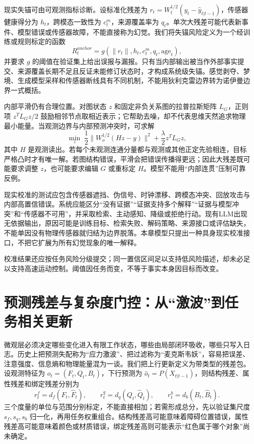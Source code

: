 现实失锚可由可观测指标诊断。设标准化残差为 $r_t=W_t^{1/2}(y_t-\hat y_{t|t-1})$，传感器健康得分为 $h_t$，跨模态一致性为 $c_t^{m}$，来源覆盖率为 $q_t$。单次大残差可能代表新事件、模型错误或传感器故障，不能直接称为幻觉。我们将失锚风险定义为一个经训练或规则标定的函数
\[
R_t^{anchor}=g(\|r_t\|,h_t,c_t^{m},q_t,\text{age}_t),
\]
并要求 $g$ 的阈值在验证集上给出误报与漏报。只有当内部输出被当作外部事实提交、来源覆盖长期不足且反证未能修订状态时，才构成系统级失锚。感觉剥夺、梦境、生成模型采样和传感器断线具有不同机制，不能用狄利克雷边界转为诺伊曼边界一式概括。

内部平滑仍有合理位置。对图状态 $z$ 和固定非负关系图的拉普拉斯矩阵 $L_G$，正则项 $z^TL_Gz/2$ 鼓励相邻节点取相近表示；它帮助去噪，却不代表思维天然追求物理最小能量。当观测边界与内部预测冲突时，可求解
\[
\min_z\;\frac12\|W_o^{1/2}(Hz-y)\|^2+\frac{\lambda}{2}z^TL_Gz,
\]
其中 $H$ 是观测读出。若每个未观测连通分量都与观测或其他正定先验相连，目标严格凸时才有唯一解。若图结构错误，平滑会把错误传播得更远；因此大残差既可能要求调整 $z$，也可能要求编辑 $G$ 或重标定 $H$。模型不能用“内部连贯”压制可靠反例。

现实校准的测试应包含传感器遮挡、伪信号、时钟漂移、跨模态冲突、回放攻击与内部高置信错误。系统应能区分“没有证据”“证据支持多个解释”“证据与模型冲突”和“传感器不可用”，并采取检索、主动感知、降级或拒绝行动。现有LLM出现无依据输出，原因可能是训练目标、检索失败、解码策略、来源接口或评估缺失，不能单因没有物理传感器就归结为边界脱落。本章模型只提出一种具身现实校准接口，不把它扩展为所有幻觉现象的唯一解释。

校准结果还应按任务风险分级提交；同一置信区间足以支持低风险描述，却未必足以支持高速运动控制。阈值因任务而变，不等于事实本身因目标而改变。

\section{预测残差与复杂度门控：从“激波”到任务相关更新}
\label{sec:section_8020}

微观层必须决定哪些变化进入有限工作状态，哪些由局部闭环吸收，哪些只写入日志。历史上把预测失配称为“应力激波”、把过滤称为“麦克斯韦妖”，容易把误差、注意强度、信息熵和物理能量混为一谈。我们把上行更新定义为带类型的残差包。设观测特征为 $o_t=(F_t,Q_t,B_t)$，下行预测为 $\hat o_t=P(X_{t|t-1})$，则结构残差、属性残差和绑定残差分别为
\[
r_t^f=d_f(F_t,\hat F_t),\qquad r_t^q=d_q(Q_t,\hat Q_t),\qquad r_t^b=d_b(B_t,\hat B_t).
\]
三个度量的单位与范围分别标定，不能直接相加；若需形成总分，先以验证集尺度 $s_f,s_q,s_b$ 归一化，再用任务权重组合。结构残差高可能意味着障碍位置错误，属性残差高可能意味着颜色或材质错误，绑定残差高则可能表示“红色属于哪个对象”尚未确定。

